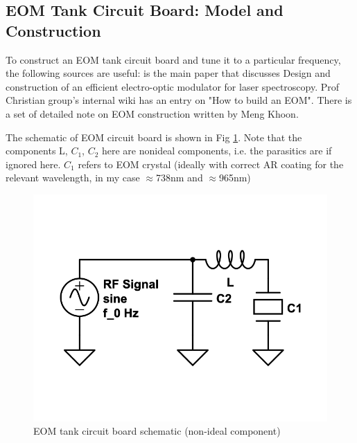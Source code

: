 \documentclass[12pt]{report}
\begin{document}
\subsection{EOM Tank Circuit Board: Model and Construction}
To construct an EOM tank circuit board and tune it to a particular frequency, the following sources are useful: \cite{20MHzEOM}is the main paper that discusses Design and construction of an efficient electro-optic modulator for laser spectroscopy. Prof Christian group's internal wiki has an entry on "How to build an EOM". There is a set of detailed note on EOM construction written by Meng Khoon. 
\\
\par
The schematic of EOM circuit board is shown in Fig \ref{fig:eom-tank-cirucuit1}. Note that the components L, $C_1$, $C_2$ here are nonideal components, i.e. the parasitics are if ignored here.
$C_1$ refers to EOM crystal (ideally with correct AR coating for the relevant wavelength, in my case $\approx$738nm and $\approx$965nm)

\begin{figure}[H]
    \centering
    \includegraphics[width=.5\textwidth]{eom-tank-cirucuit1.png}
    \caption{EOM tank circuit board schematic (non-ideal component)}
    \label{fig:eom-tank-cirucuit1}
\end{figure}
\end{document}
